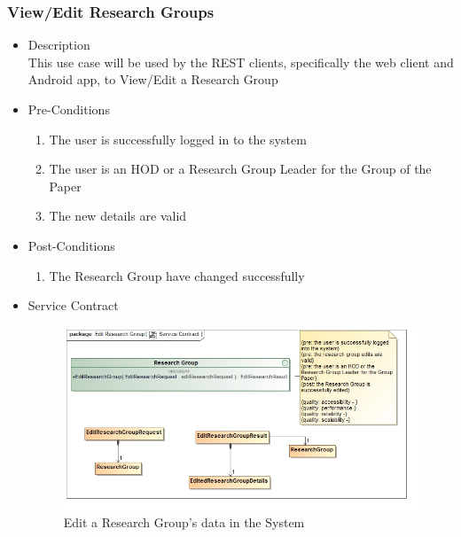 \documentclass[a4paper,10pt]{article}
\begin{document}
\subsubsection{View/Edit Research Groups}
	\begin{itemize}
		\item Description\\
			This use case will be used by the REST clients, specifically the web client and Android app, to View/Edit a Research Group
		\item Pre-Conditions
			\begin{enumerate}
				\item The user is successfully logged in to the system
				\item The user is an HOD or a Research Group Leader for the Group of the Paper
				\item The new details are valid
			\end{enumerate}
		\item Post-Conditions
			\begin{enumerate}
				\item The Research Group have changed successfully
						
			\end{enumerate}
		\item Service Contract
			\begin{figure}[H]
				\includegraphics[scale=0.5]{Edit_Research_Group.jpg}
				\caption{Edit a Research Group's data in the System}
			\end{figure}
	\end{itemize}
\end{document}
